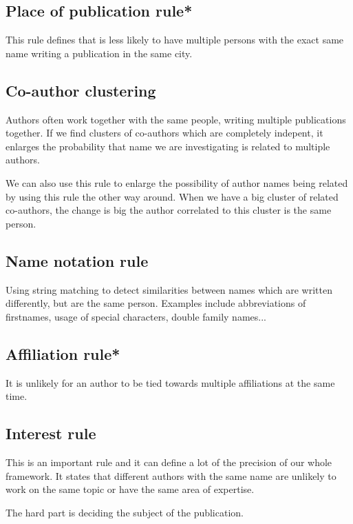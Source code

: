 \subsection{Place of publication rule*}

This rule defines that is less likely to have multiple persons with the exact same name writing a publication in the same city.

\subsection{Co-author clustering}


Authors often work together with the same people, writing multiple publications together. If we find clusters 
of co-authors which are completely indepent, it enlarges the probability that name we are investigating is related to multiple authors.

We can also use this rule to enlarge the possibility of author names being related by using this rule the other way around. When we have a big cluster of related co-authors, the change is big the author correlated to this cluster is the same person.

\subsection{Name notation rule}

Using string matching to detect similarities between names which are written differently, but are the same person. Examples include abbreviations of firstnames, usage of special characters, double family names...

\subsection{Affiliation rule*}

It is unlikely for an author to be tied towards multiple affiliations at the same time.

\subsection{Interest rule}

This is an important rule and it can define a lot of the precision of our whole framework. It states that different authors with the same name are unlikely to work on the same topic or have the same area of expertise.

The hard part is deciding the subject of the publication.